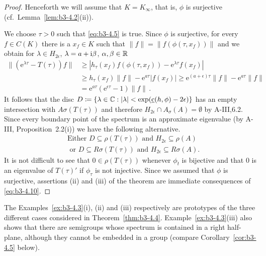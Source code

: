 \begin{proof}
	Henceforth we will assume that $K = K_{\infty}$, that is, $\phi$ is surjective (cf.\ Lemma~\ref{lem:b3-4.2}(ii)).
	
	We choose $\tau > 0$ such that \eqref{eq:b3-4.5} is true.
	Since $\phi$ is surjective, for every $f \in C(K)$ there is a $x_{f} \in K$ such that $\|f\| = \|f(\phi(\tau,x_{f}))\|$ and we obtain for $\lambda \in H_{2\epsilon}$, $\lambda = a + \mathrm{i}\beta$, $\alpha,\beta \in \mathbb{R}$
	\begin{equation}\label{eq:b3-4.9}
		\begin{aligned}
			\|(\mathrm{e}^{\lambda\tau} - T(\tau))f\| &\geq |h_{\tau}(x_{f})f(\phi(\tau,x_{f})) - \mathrm{e}^{\lambda\tau}f(x_{f})| \\
			& \geq h_{\tau}(x_{f})\|f\| - \mathrm{e}^{a\tau}|f(x_{f})| 
			 \geq \mathrm{e}^{(a+\epsilon)\tau}\|f\| - \mathrm{e}^{a\tau}\|f\| \\
			&= \mathrm{e}^{a\tau}(\mathrm{e}^{\epsilon\tau} - 1)\|f\|\,.
		\end{aligned}
	\end{equation}
	It follows that the disc $D \coloneq \{\lambda \in \mathbb{C} : |\lambda| < \exp(\underbar{c}(h,\phi)-2\epsilon)\}$ has an empty intersection with $A{\sigma}(T(\tau))$ and therefore $H_{2\epsilon}\cap A_{\sigma}(A) = \emptyset$ by A-III,6.2.
	Since every boundary point of the spectrum is an approximate eigenvalue (by A-III, Proposition~2.2(i)) we have the following alternative.
	\begin{equation}\label{eq:b3-4.10}
		\begin{aligned}
		&\text{Either } D \subseteq \rho(T(\tau)) \text{ and } H_{2\epsilon} \subseteq \rho(A) \\
		&\text{ or } D \subseteq R{\sigma}(T(\tau)) \text{ and } H_{2\epsilon} \subseteq R{\sigma}(A).
	\end{aligned}
	\end{equation}
	It is not difficult to see that $0 \in \rho(T(\tau))$ whenever $\phi_{t}$ is bijective and that $0$ is an eigenvalue of $T(\tau)'$ if $\phi_{\tau}$ is not injective.
	Since we assumed that $\phi$ is surjective, assertions (ii) and (iii) of the theorem are immediate consequences of \eqref{eq:b3-4.10}.
\end{proof}
The Examples~\ref{ex:b3-4.3}(i), (ii) and (iii) respectively are prototypes of the three different cases considered in Theorem~\ref{thm:b3-4.4}.
Example~\ref{ex:b3-4.3}(iii) also shows that there are semigroups whose spectrum is contained in a right half-plane, although they cannot be embedded in a group (compare Corollary~\ref{cor:b3-4.5} below).
